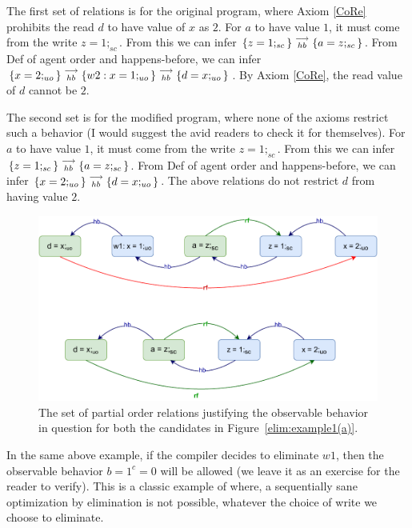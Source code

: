        The first set of relations is for the original program, where Axiom \ref{CoRe} prohibits the read $d$ to have value of $x$ as $2$.
        For $a$ to have value $1$, it must come from the write $z=1;_{sc}$.
        From this we can infer $\{z=1;_{sc}\}\stackrel{\longrightarrow}{_{hb}}\{a=z;_{sc}\}$.
        From Def of agent order and happens-before, we can infer $\{x=2;_{uo}\}\stackrel{\longrightarrow}{_{hb}}\{w2:x=1;_{uo}\}\stackrel{\longrightarrow}{_{hb}}\{d=x;_{uo}\}$.
        By Axiom \ref{CoRe}, the read value of $d$ cannot be $2$. 
    
        The second set is for the modified program, where none of the axioms restrict such a behavior (I would suggest the avid readers to check it for themselves).
        For $a$ to have value $1$, it must come from the write $z=1;_{sc}$.
        From this we can infer $\{z=1;_{sc}\}\stackrel{\longrightarrow}{_{hb}}\{a=z;_{sc}\}$.
        From Def of agent order and happens-before, we can infer $\{x=2;_{uo}\}\stackrel{\longrightarrow}{_{hb}}\{d=x;_{uo}\}$.
        The above relations do not restrict $d$ from having value $2$.
    
        \begin{figure}[H]
            \centering
            \includegraphics[scale=0.7]{5.Elimination/EliminationExample1(b).pdf}
            \caption{The set of partial order relations justifying the observable behavior in question for both the candidates in Figure~\ref{elim:example1(a)}.} 
            \label{elim:example1(b)}
        \end{figure}

        In the same above example, if the compiler decides to eliminate $w1$, then the observable behavior $b=1 ^ c=0$ will be allowed (we leave it as an exercise for the reader to verify).
        This is a classic example of where, a sequentially sane optimization by elimination is not possible, whatever the choice of write we choose to eliminate.  

